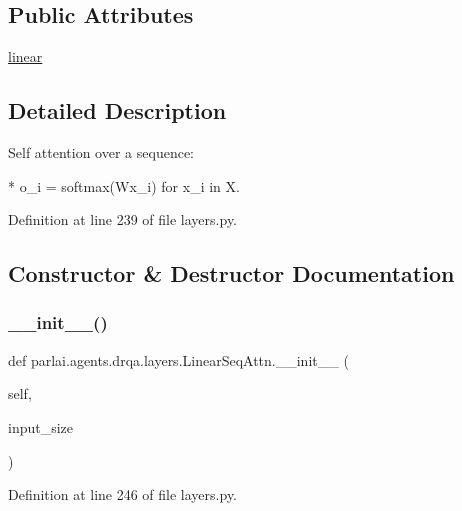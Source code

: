 \subsection*{Public Attributes}
\begin{DoxyCompactItemize}
\item 
\hyperlink{classparlai_1_1agents_1_1drqa_1_1layers_1_1LinearSeqAttn_a5e221c809306db7c5877e5f6f919ac7f}{linear}
\end{DoxyCompactItemize}


\subsection{Detailed Description}
\begin{DoxyVerb}Self attention over a sequence:

* o_i = softmax(Wx_i) for x_i in X.
\end{DoxyVerb}
 

Definition at line 239 of file layers.\+py.



\subsection{Constructor \& Destructor Documentation}
\mbox{\label{classparlai_1_1agents_1_1drqa_1_1layers_1_1LinearSeqAttn_a4f7535d9314733bcbcbe957d96600907}} 
\subsubsection{\texorpdfstring{\+\_\+\+\_\+init\+\_\+\+\_\+()}{\_\_init\_\_()}}
{\footnotesize\ttfamily def parlai.\+agents.\+drqa.\+layers.\+Linear\+Seq\+Attn.\+\_\+\+\_\+init\+\_\+\+\_\+ (\begin{DoxyParamCaption}\item[{}]{self,  }\item[{}]{input\+\_\+size }\end{DoxyParamCaption})}



Definition at line 246 of file layers.\+py.


